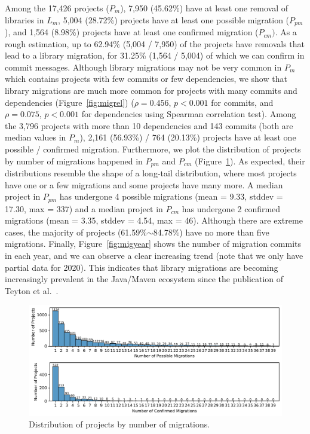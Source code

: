 \documentclass[sigconf, screen]{acmart}
\begin{document}
Among the 17,426 projects ($P_m$), 7,950 (45.62\%) have at least one removal of libraries in $L_m$, 5,004 (28.72\%) projects have at least one possible migration ($P_{pm}$), and 1,564 (8.98\%) projects have at least one confirmed migration ($P_{cm})$.
As a rough estimation, up to 62.94\% (5,004 / 7,950) of the projects have removals that lead to a library migration, for 31.25\% (1,564 / 5,004) of  which we can confirm in commit messages.
Although library migrations may not be very common in $P_m$ which contains projects with few commits or few dependencies, we show that library migrations are much more common for projects with many commits and dependencies (Figure~\ref{fig:migrel}) ($\rho=0.456$, $p < 0.001$ for commits, and $\rho=0.075$, $p<0.001$ for dependencies using Spearman correlation test).
Among the 3,796 projects with more than 10 dependencies and 143 commits (both are median values in $P_m$), 2,161 (56.93\%) / 764 (20.13\%) projects have at least one possible / confirmed migration.
Furthermore, we plot the distribution of projects by number of migrations happened in $P_{pm}$ and $P_{cm}$ (Figure~\ref{fig:migdist}).
As expected, their distributions resemble the shape of a long-tail distribution, where most projects have one or a few migrations and some projects have many more. 
A median project in $P_{pm}$ has undergone 4 possible migrations (mean = 9.33, stddev = 17.30, max = 337) and a median project in $P_{cm}$ has undergone 2 confirmed migrations (mean = 3.35, stddev = 4.54, max = 46).
Although there are extreme cases, the majority of projects (61.59\%$\sim$84.78\%) have no more than five migrations.
Finally, Figure~\ref{fig:migyear} shows the number of migration commits in each year, and we can observe a clear increasing trend (note that we only have partial data for 2020). 
This indicates that library migrations are becoming increasingly prevalent in the Java/Maven ecosystem since the publication of Teyton et al.~\cite{teyton2014study}.

\begin{figure}[t]
  \centering
  \includegraphics[width=\linewidth]{fig/migdist.pdf}
\vspace{-7mm}
  \caption{Distribution of projects by number of migrations.}
  \label{fig:migdist}
\vspace{-4mm}
\end{figure}
\end{document}

